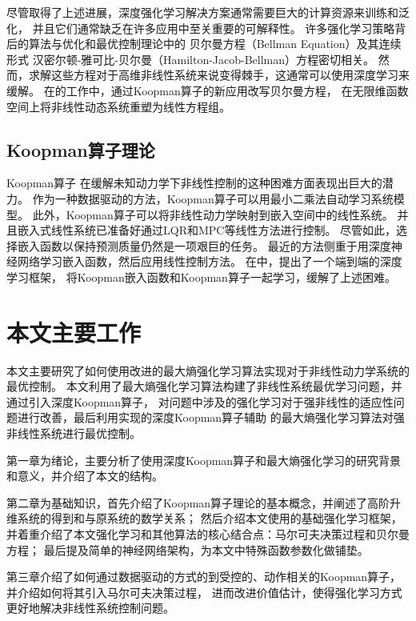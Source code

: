 \documentclass[AutoFakeBold]{LZUThesis}
\begin{document}
尽管取得了上述进展，深度强化学习解决方案通常需要巨大的计算资源来训练和泛化，
并且它们通常缺乏在许多应用中至关重要的可解释性。
许多强化学习策略背后的算法与优化和最优控制理论\cite{Brunton_book_2019}中的
贝尔曼方程（Bellman Equation）及其连续形式
汉密尔顿-雅可比-贝尔曼（Hamilton-Jacob-Bellman）方程密切相关。
然而，求解这些方程对于高维非线性系统来说变得棘手，这通常可以使用深度学习来缓解。
在\cite{karl}的工作中，通过Koopman算子的新应用改写贝尔曼方程，
在无限维函数空间上将非线性动态系统重塑为线性方程组。

\subsection{Koopman算子理论}
Koopman算子\cite{koopman_hamiltonian_1931, 
koopman_dynamical_1932, mezic_comparison_2004}
在缓解未知动力学下非线性控制的这种困难方面表现出巨大的潜力。
作为一种数据驱动的方法，Koopman算子可以用最小二乘法自动学习系统模型。
此外，Koopman算子可以将非线性动力学映射到嵌入空间中的线性系统。
并且嵌入式线性系统已准备好通过LQR\cite{bemporad_explicit_2002}和MPC\cite{fernandez-camacho_robust_1995}等线性方法进行控制。
尽管如此，选择嵌入函数以保持预测质量仍然是一项艰巨的任务。
最近的方法侧重于用深度神经网络\cite{mainuddin_detecting_2023}学习嵌入函数，然后应用线性控制方法\cite{han_deep_2020}。
在\cite{dkn}中，提出了一个端到端的深度学习框架，
将Koopman嵌入函数和Koopman算子一起学习，缓解了上述困难。

\section{本文主要工作}
本文主要研究了如何使用改进的最大熵强化学习算法实现对于非线性动力学系统的最优控制。
本文利用了最大熵强化学习算法构建了非线性系统最优学习问题，并通过引入深度Koopman算子，
对问题中涉及的强化学习对于强非线性的适应性问题进行改善，最后利用实现的深度Koopman算子辅助
的最大熵强化学习算法对强非线性系统进行最优控制。

第一章为绪论，主要分析了使用深度Koopman算子和最大熵强化学习的研究背景和意义，并介绍了本文的结构。

第二章为基础知识，首先介绍了Koopman算子理论的基本概念，并阐述了高阶升维系统的得到和与原系统的数学关系；
然后介绍本文使用的基础强化学习框架，并着重介绍了本文强化学习和其他算法的核心结合点：马尔可夫决策过程和贝尔曼方程；
最后提及简单的神经网络架构，为本文中特殊函数参数化做铺垫。

第三章介绍了如何通过数据驱动的方式的到受控的、动作相关的Koopman算子，并介绍如何将其引入马尔可夫决策过程，
进而改进价值估计，使得强化学习方式更好地解决非线性系统控制问题。
\end{document}
